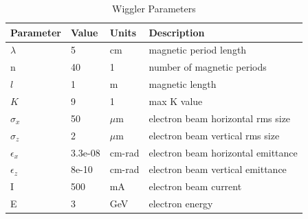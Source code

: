 \documentclass[preprint]{iucr}              %
\begin{document}
\begin{table}\label{ivwbalder}
\caption{Wiggler Parameters}
\begin{tabular}{@{}llll@{}}
\toprule
Parameter       & Value         & Units     & Description                           \\
\hline
$\lambda$       & 5             & cm        & magnetic period length                \\
n               & 40            & 1         & number of magnetic periods            \\ 
$l$             & 1             & m         & magnetic length                       \\
$K$             & 9             & 1         & max K value                           \\
$\sigma_x$      & 50            & $\mu$m    & electron beam horizontal rms size     \\
$\sigma_z$      & 2             & $\mu$m    & electron beam vertical rms size       \\
$\epsilon_x$    & 3.3e-08       & cm-rad    & electron beam horizontal emittance    \\
$\epsilon_z$    & 8e-10         & cm-rad    & electron beam vertical emittance      \\
I               & 500           & mA        & electron beam current                 \\
E               & 3             & GeV       & electron energy                       \\
\end{tabular}
\end{table}
\end{document}

